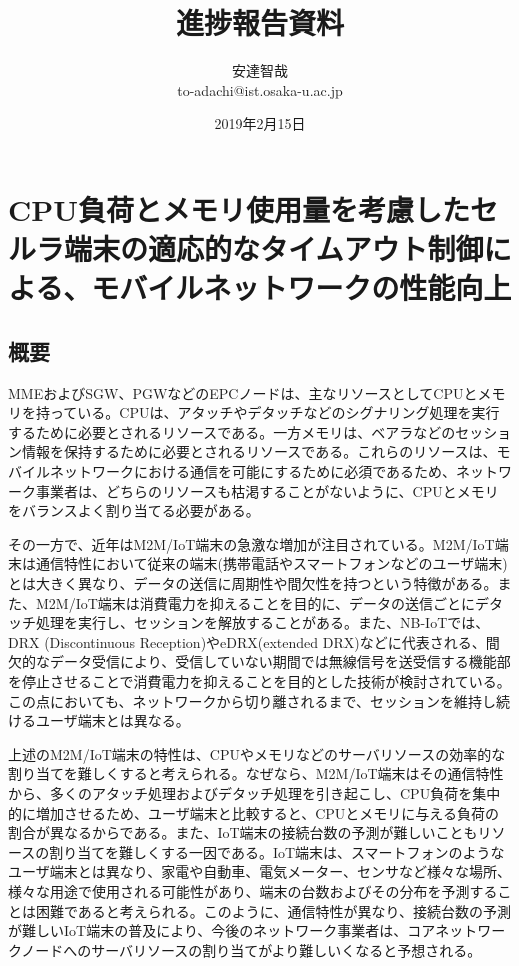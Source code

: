 \documentclass[a4j]{ujarticle}
\title{進捗報告資料}
\author{安達智哉\\to-adachi@ist.osaka-u.ac.jp}
\date{2019年2月15日}
\begin{document}
\maketitle

\section{CPU負荷とメモリ使用量を考慮したセルラ端末の適応的なタイムアウト制御による、モバイルネットワークの性能向上}


\subsection{概要}
\label{sec:abs}
MMEおよびSGW、PGWなどのEPCノードは、主なリソースとしてCPUとメモリを持っている。CPUは、アタッチやデタッチなどのシグナリング処理を実行するために必要とされるリソースである。一方メモリは、ベアラなどのセッション情報を保持するために必要とされるリソースである。これらのリソースは、モバイルネットワークにおける通信を可能にするために必須であるため、ネットワーク事業者は、どちらのリソースも枯渇することがないように、CPUとメモリをバランスよく割り当てる必要がある。

その一方で、近年はM2M/IoT端末の急激な増加が注目されている。M2M/IoT端末は通信特性において従来の端末(携帯電話やスマートフォンなどのユーザ端末)とは大きく異なり、データの送信に周期性や間欠性を持つという特徴がある。また、M2M/IoT端末は消費電力を抑えることを目的に、データの送信ごとにデタッチ処理を実行し、セッションを解放することがある。また、NB-IoTでは、DRX (Discontinuous Reception)やeDRX(extended DRX)などに代表される、間欠的なデータ受信により、受信していない期間では無線信号を送受信する機能部を停止させることで消費電力を抑えることを目的とした技術が検討されている\cite{LTERelease13におけるIoTを実現する新技術}。この点においても、ネットワークから切り離されるまで、セッションを維持し続けるユーザ端末とは異なる。

上述のM2M/IoT端末の特性は、CPUやメモリなどのサーバリソースの効率的な割り当てを難しくすると考えられる。なぜなら、M2M/IoT端末はその通信特性から、多くのアタッチ処理およびデタッチ処理を引き起こし、CPU負荷を集中的に増加させるため、ユーザ端末と比較すると、CPUとメモリに与える負荷の割合が異なるからである。また、IoT端末の接続台数の予測が難しいこともリソースの割り当てを難しくする一因である。IoT端末は、スマートフォンのようなユーザ端末とは異なり、家電や自動車、電気メーター、センサなど様々な場所、様々な用途で使用される可能性があり、端末の台数およびその分布を予測することは困難であると考えられる。このように、通信特性が異なり、接続台数の予測が難しいIoT端末の普及により、今後のネットワーク事業者は、コアネットワークノードへのサーバリソースの割り当てがより難しいくなると予想される。
\end{document}
